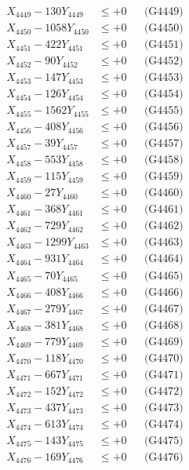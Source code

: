\documentclass[a4paper,10pt]{article}
\begin{document}
{\begin{align}
X_{4449} - 130Y_{4449} &\leq +0 && \text{(G4449)} \\
X_{4450} - 1058Y_{4450} &\leq +0 && \text{(G4450)} \\
\allowbreak
X_{4451} - 422Y_{4451} &\leq +0 && \text{(G4451)} \\
X_{4452} - 90Y_{4452} &\leq +0 && \text{(G4452)} \\
X_{4453} - 147Y_{4453} &\leq +0 && \text{(G4453)} \\
X_{4454} - 126Y_{4454} &\leq +0 && \text{(G4454)} \\
X_{4455} - 1562Y_{4455} &\leq +0 && \text{(G4455)} \\
X_{4456} - 408Y_{4456} &\leq +0 && \text{(G4456)} \\
X_{4457} - 39Y_{4457} &\leq +0 && \text{(G4457)} \\
X_{4458} - 553Y_{4458} &\leq +0 && \text{(G4458)} \\
X_{4459} - 115Y_{4459} &\leq +0 && \text{(G4459)} \\
X_{4460} - 27Y_{4460} &\leq +0 && \text{(G4460)} \\
\allowbreak
X_{4461} - 368Y_{4461} &\leq +0 && \text{(G4461)} \\
X_{4462} - 729Y_{4462} &\leq +0 && \text{(G4462)} \\
X_{4463} - 1299Y_{4463} &\leq +0 && \text{(G4463)} \\
X_{4464} - 931Y_{4464} &\leq +0 && \text{(G4464)} \\
X_{4465} - 70Y_{4465} &\leq +0 && \text{(G4465)} \\
X_{4466} - 408Y_{4466} &\leq +0 && \text{(G4466)} \\
X_{4467} - 279Y_{4467} &\leq +0 && \text{(G4467)} \\
X_{4468} - 381Y_{4468} &\leq +0 && \text{(G4468)} \\
X_{4469} - 779Y_{4469} &\leq +0 && \text{(G4469)} \\
X_{4470} - 118Y_{4470} &\leq +0 && \text{(G4470)} \\
\allowbreak
X_{4471} - 667Y_{4471} &\leq +0 && \text{(G4471)} \\
X_{4472} - 152Y_{4472} &\leq +0 && \text{(G4472)} \\
X_{4473} - 437Y_{4473} &\leq +0 && \text{(G4473)} \\
X_{4474} - 613Y_{4474} &\leq +0 && \text{(G4474)} \\
X_{4475} - 143Y_{4475} &\leq +0 && \text{(G4475)} \\
X_{4476} - 169Y_{4476} &\leq +0 && \text{(G4476)} \\

\end{align}}
\end{document}

